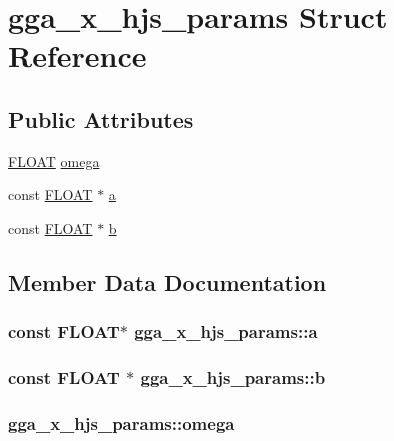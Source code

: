 \hypertarget{structgga__x__hjs__params}{\section{gga\-\_\-x\-\_\-hjs\-\_\-params Struct Reference}
\label{structgga__x__hjs__params}
}
\subsection*{Public Attributes}
\begin{DoxyCompactItemize}
\item 
\hyperlink{src_2xc__config_8h_ae8690abbffa85934d64d545920e2b108}{F\-L\-O\-A\-T} \hyperlink{structgga__x__hjs__params_a4297ac219894a38ab9b2e09d6cecab43}{omega}
\item 
const \hyperlink{src_2xc__config_8h_ae8690abbffa85934d64d545920e2b108}{F\-L\-O\-A\-T} $\ast$ \hyperlink{structgga__x__hjs__params_ab588af8f458d43da27203aaee6d253ca}{a}
\item 
const \hyperlink{src_2xc__config_8h_ae8690abbffa85934d64d545920e2b108}{F\-L\-O\-A\-T} $\ast$ \hyperlink{structgga__x__hjs__params_adeb908d0305c630ab7df0d4fbf9a0714}{b}
\end{DoxyCompactItemize}


\subsection{Member Data Documentation}
\hypertarget{structgga__x__hjs__params_ab588af8f458d43da27203aaee6d253ca}{
\subsubsection[{a}]{\setlength{\rightskip}{0pt plus 5cm}const {\bf F\-L\-O\-A\-T}$\ast$ gga\-\_\-x\-\_\-hjs\-\_\-params\-::a}}\label{structgga__x__hjs__params_ab588af8f458d43da27203aaee6d253ca}
\hypertarget{structgga__x__hjs__params_adeb908d0305c630ab7df0d4fbf9a0714}{
\subsubsection[{b}]{\setlength{\rightskip}{0pt plus 5cm}const {\bf F\-L\-O\-A\-T} $\ast$ gga\-\_\-x\-\_\-hjs\-\_\-params\-::b}}\label{structgga__x__hjs__params_adeb908d0305c630ab7df0d4fbf9a0714}
\hypertarget{structgga__x__hjs__params_a4297ac219894a38ab9b2e09d6cecab43}{
\subsubsection[{omega}]{ gga\-\_\-x\-\_\-hjs\-\_\-params\-::omega}}\label{structgga__x__hjs__params_a4297ac219894a38ab9b2e09d6cecab43}


